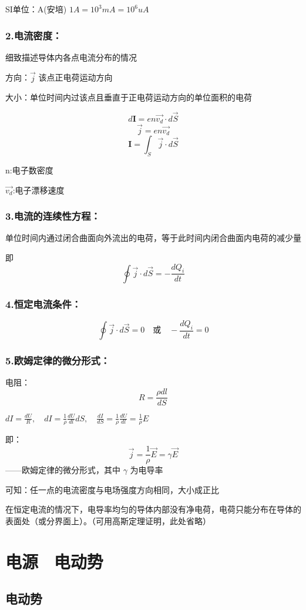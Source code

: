 \documentclass[12pt, a4paper, oneside]{ctexbook}
\begin{document}
SI单位：A(安培)\quad
$ 1A=10^3 mA=10^6 uA $ 
\subsubsection{2.电流密度：}
细致描述导体内各点电流分布的情况

方向：$ \overrightarrow{j} $ \quad 该点正电荷运动方向

大小：单位时间内过该点且垂直于正电荷运动方向的单位面积的电荷

$$ d\boldsymbol{I}=en\vec{v_d}\cdot d\vec{S} $$
$$ \vec{j}=en\vec{v_d} $$
$$ \boldsymbol{I}=\int_S \vec{j}\cdot d\vec{S} $$

n:电子数密度

$ \vec{v_d} $:电子漂移速度

\subsubsection{3.电流的连续性方程：}
单位时间内通过闭合曲面向外流出的电荷，等于此时间内闭合曲面内电荷的减少量

即$$ \oint \vec{j}\cdot d\vec{S}=-\frac{dQ_i}{dt} $$

\subsubsection{4.恒定电流条件：}
$$ \oint \vec{j}\cdot d\vec{S}=0 \quad \text{或} \quad -\frac{dQ_i}{dt}=0 $$

\subsubsection{5.欧姆定律的微分形式：}

电阻：$$ R=\frac{\rho dl}{dS} $$

$ dI=\frac{dU}{R} ,\quad dI=\frac{1}{\rho} \frac{dU}{dl}dS ,\quad \frac{dI}{dS}= \frac{1}{\rho} \frac{dU}{dl} =\frac{1}{\rho}E $

即：$$ \vec{j}=\frac{1}{\rho} \vec{E}=\gamma \vec{E} $$
——欧姆定律的微分形式，其中 $\gamma$ 为电导率

可知：任一点的电流密度与电场强度方向相同，大小成正比

在恒定电流的情况下，电导率均匀的导体内部没有净电荷，电荷只能分布在导体的表面处（或分界面上）。\quad （可用高斯定理证明，此处省略）

\section{电源 \ 电动势}
\subsection{电动势}
\subsubsection{}
\end{document}
